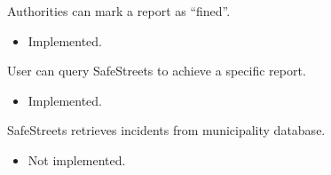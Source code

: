 \documentclass[../ITD.tex]{subfiles}
\begin{document}
\begin{enumerate}
         Authorities can mark a report as “fined”.
        \begin{itemize}
            \item Implemented.
        \end{itemize}

         User can query SafeStreets to achieve a specific report.
        \begin{itemize}
            \item Implemented.
        \end{itemize}

         SafeStreets retrieves incidents from municipality database.
        \begin{itemize}
            \item Not implemented.
        \end{itemize}
    \end{enumerate}
\end{document}
